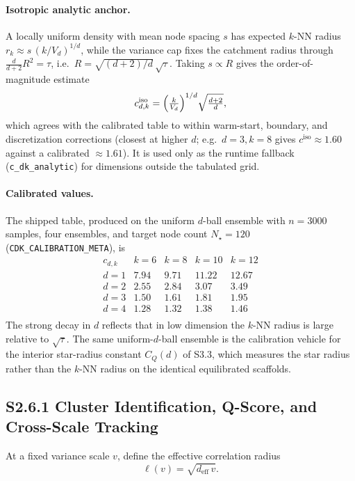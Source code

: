 \documentclass[11pt]{article}
\begin{document}
\paragraph{Isotropic analytic anchor.}
A locally uniform density with mean node spacing $s$ has expected $k$-NN radius
$r_k\approx s\,(k/V_d)^{1/d}$, while the variance cap fixes the catchment radius
through $\tfrac{d}{d+2}R^2=\tau$, i.e.\ $R=\sqrt{(d+2)/d}\,\sqrt\tau$. Taking
$s\propto R$ gives the order-of-magnitude estimate
\[
c_{d,k}^{\mathrm{iso}}
=
\Bigl(\tfrac{k}{V_d}\Bigr)^{1/d}\sqrt{\tfrac{d+2}{d}},
\]
which agrees with the calibrated table to within warm-start, boundary, and
discretization corrections (closest at higher $d$; e.g.\ $d=3,k=8$ gives
$c^{\mathrm{iso}}\approx1.60$ against a calibrated $\approx1.61$). It is used only
as the runtime fallback (\texttt{c\_dk\_analytic}) for dimensions outside the
tabulated grid.

\paragraph{Calibrated values.}
The shipped table, produced on the uniform $d$-ball ensemble with $n=3000$
samples, four ensembles, and target node count $N_\star=120$
(\texttt{CDK\_CALIBRATION\_META}), is
\[
\begin{array}{c|cccc}
c_{d,k} & k{=}6 & k{=}8 & k{=}10 & k{=}12\\
\hline
d{=}1 & 7.94 & 9.71 & 11.22 & 12.67\\
d{=}2 & 2.55 & 2.84 & 3.07 & 3.49\\
d{=}3 & 1.50 & 1.61 & 1.81 & 1.95\\
d{=}4 & 1.28 & 1.32 & 1.38 & 1.46\\
\end{array}
\]
The strong decay in $d$ reflects that in low dimension the $k$-NN radius is large
relative to $\sqrt\tau$. The same uniform-$d$-ball ensemble is the calibration
vehicle for the interior star-radius constant $C_Q(d)$ of S3.3, which measures
the star radius rather than the $k$-NN radius on the identical equilibrated
scaffolds.

\subsection*{S2.6.1 Cluster Identification, Q-Score, and Cross-Scale Tracking}
\label{sec:si-cluster-derivation}
At a fixed variance scale $v$, define the effective correlation radius
\[
\ell(v)=\sqrt{d_{\mathrm{eff}}\,v}.
\]
\end{document}
